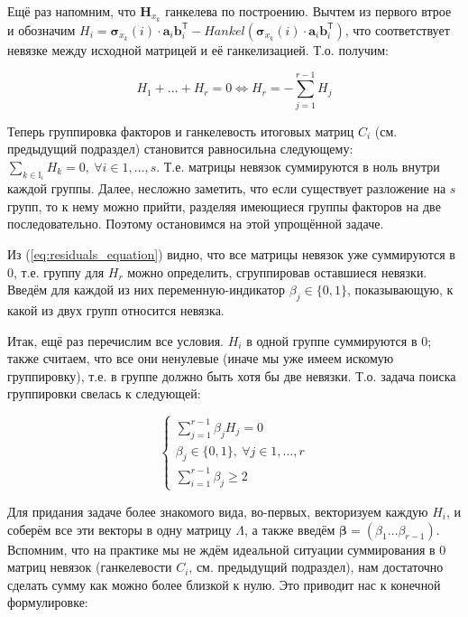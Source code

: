 	Ещё раз напомним, что $ \mathbf{H}_{x_k} $ ганкелева по построению. Вычтем из первого втрое и обозначим $ H_i = \boldsymbol{\sigma}_{x_k}(i) \cdot \mathbf{a}_i  \mathbf{b}_i^{\mathsf{T}} - Hankel(\boldsymbol{\sigma}_{x_k}(i) \cdot \mathbf{a}_i  \mathbf{b}_i^{\mathsf{T}}) $, что соответствует невязке между исходной матрицей и её ганкелизацией. Т.о. получим:
	
	\begin{equation}\label{eq:residuals_equation}
		H_1 + \ldots + H_r = 0 \Leftrightarrow H_r = - \sum\limits_{j = 1}^{r - 1} H_j
	\end{equation}
	
	Теперь группировка факторов и ганкелевость итоговых матриц $ C_i $ (см. предыдущий подраздел) становится равносильна следующему: $ \sum_{k \in \mathbb{I}_i} H_k = 0, \  \forall i \in 1, \ldots, s $. Т.е. матрицы невязок суммируются в ноль внутри каждой группы. Далее, несложно заметить, что если существует разложение на $ s $ групп, то к нему можно прийти, разделяя имеющиеся группы факторов на две последовательно. Поэтому остановимся на этой упрощённой задаче.
	
	Из (\ref{eq:residuals_equation}) видно, что все матрицы невязок уже суммируются в $ 0 $, т.е. группу для $ H_r $ можно определить, сгруппировав оставшиеся невязки. Введём для каждой из них переменную-индикатор $ \beta_j \in \{0, 1\} $, показывающую, к какой из двух групп относится невязка. 
	
	Итак, ещё раз перечислим все условия. $ H_i $ в одной группе суммируются в $ 0 $; также считаем, что все они ненулевые (иначе мы уже имеем искомую группировку), т.е. в группе должно быть хотя бы две невязки. Т.о. задача поиска группировки свелась к следующей:
	
	\begin{equation}
		\begin{cases*}
			\sum\limits_{j = 1}^{r - 1} \beta_j H_j = 0 \\
			\beta_j \in \{0, 1\}, \ \forall j \in 1, \ldots, r \\
			\sum\limits_{i = 1}^{r - 1} \beta_j \ge 2
		\end{cases*}
	\end{equation}
	
	Для придания задаче более знакомого вида, во-первых, векторизуем каждую $ H_i $, и соберём все эти векторы в одну матрицу $ \Lambda $, а также введём $ \boldsymbol{\beta} = (\beta_1 \ldots \beta_{r-1}) $. Вспомним, что на практике мы не ждём идеальной ситуации суммирования в $ 0 $ матриц невязок (ганкелевости $ C_i $, см. предыдущий подраздел), нам достаточно сделать сумму как можно более близкой к нулю. Это приводит нас к конечной формулировке:
	

